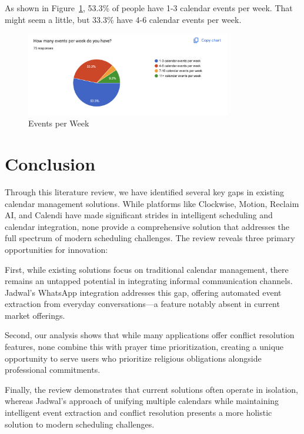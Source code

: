 \documentclass[12pt,a4paper]{report}
\begin{document}
As shown in Figure~\ref{fig:events-per-week}, 53.3\% of people have 1-3 calendar events per week. That might seem a little, but 33.3\% have 4-6 calendar events per week.

\begin{figure}[!h]
    \centering
    \includegraphics[width=0.8\textwidth]{images/survey/events-per-week.png}
    \caption{Events per Week}
    \label{fig:events-per-week}
\end{figure}

\section{Conclusion}

Through this literature review, we have identified several key gaps in existing calendar management solutions. While platforms like Clockwise, Motion, Reclaim AI, and Calendi have made significant strides in intelligent scheduling and calendar integration, none provide a comprehensive solution that addresses the full spectrum of modern scheduling challenges. The review reveals three primary opportunities for innovation:

First, while existing solutions focus on traditional calendar management, there remains an untapped potential in integrating informal communication channels. Jadwal's WhatsApp integration addresses this gap, offering automated event extraction from everyday conversations—a feature notably absent in current market offerings.

Second, our analysis shows that while many applications offer conflict resolution features, none combine this with prayer time prioritization, creating a unique opportunity to serve users who prioritize religious obligations alongside professional commitments.

Finally, the review demonstrates that current solutions often operate in isolation, whereas Jadwal's approach of unifying multiple calendars while maintaining intelligent event extraction and conflict resolution presents a more holistic solution to modern scheduling challenges.
\end{document}
